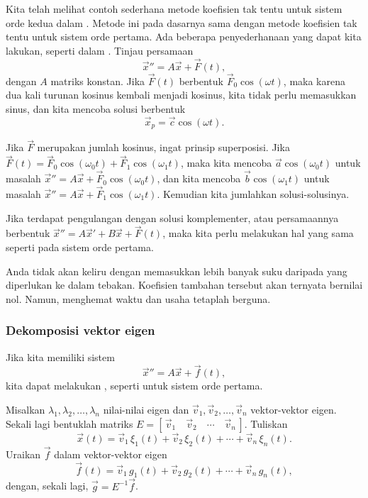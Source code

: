 Kita telah melihat contoh sederhana metode
koefisien
tak tentu
untuk sistem orde kedua dalam .
Metode ini pada dasarnya sama dengan metode koefisien tak tentu
untuk sistem orde pertama.
Ada beberapa penyederhanaan yang dapat kita lakukan, seperti dalam 
.  Tinjau persamaan
\begin{equation*}
{\vec{x}}'' = A \vec{x} + \vec{F}(t) ,
\end{equation*}
dengan $A$ matriks konstan.  Jika $\vec{F}(t)$ berbentuk
$\vec{F}_0 \cos (\omega t)$, maka karena dua kali turunan kosinus kembali menjadi
kosinus,
kita tidak perlu memasukkan sinus, dan
kita mencoba solusi berbentuk
\begin{equation*}
\vec{x}_p = \vec{c} \cos (\omega t) .
\end{equation*}

Jika $\vec{F}$ merupakan jumlah
kosinus, ingat prinsip superposisi.
Jika $\vec{F}(t) =
\vec{F}_0 \cos (\omega_0 t) + 
\vec{F}_1 \cos (\omega_1 t)$, maka kita mencoba
$\vec{a} \cos (\omega_0 t)$ untuk masalah
${\vec{x}}'' = A \vec{x} + \vec{F}_0 \cos (\omega_0 t)$, dan kita mencoba
$\vec{b} \cos (\omega_1 t)$ untuk masalah
${\vec{x}}'' = A \vec{x} + \vec{F}_1 \cos (\omega_1 t)$.  Kemudian kita jumlahkan
solusi-solusinya.

Jika terdapat pengulangan dengan solusi komplementer, atau persamaannya
berbentuk
${\vec{x}}'' = A{\vec{x}}'+ B \vec{x} + \vec{F}(t)$, maka kita perlu
melakukan hal yang sama seperti pada sistem orde pertama.

Anda tidak akan keliru dengan memasukkan lebih banyak suku daripada yang diperlukan ke dalam
tebakan.  Koefisien tambahan tersebut akan ternyata
bernilai nol.  Namun, menghemat waktu dan usaha tetaplah berguna.

\subsubsection{Dekomposisi vektor eigen}

Jika kita memiliki sistem
\begin{equation*}
{\vec{x}}'' = A \vec{x} + \vec{f}(t) ,
\end{equation*}
kita dapat melakukan \emph{},
seperti untuk sistem orde pertama.

Misalkan $\lambda_1, \lambda_2, \ldots, \lambda_n$ nilai-nilai eigen
dan $\vec{v}_1, \vec{v}_2, \ldots, \vec{v}_n$ vektor-vektor eigen.
Sekali lagi bentuklah matriks %
$E = [\, \vec{v}_1 \quad \vec{v}_2 \quad \cdots \quad \vec{v}_n \,]$.
Tuliskan
\begin{equation*}
\vec{x}(t) =
\vec{v}_1 \, \xi_1(t) + 
\vec{v}_2 \, \xi_2(t) + \cdots +
\vec{v}_n \, \xi_n(t) .
\end{equation*}
Uraikan $\vec{f}$ dalam vektor-vektor eigen
\begin{equation*}
\vec{f}(t) =
\vec{v}_1 \, g_1(t) + 
\vec{v}_2 \, g_2(t) + \cdots +
\vec{v}_n \, g_n(t) ,
\end{equation*}
dengan, sekali lagi, $\vec{g} = E^{-1} \vec{f}$.

